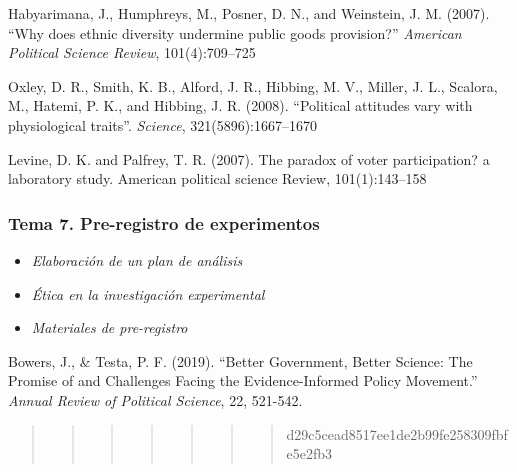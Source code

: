 \documentclass[
  12pt,
]{article}
\providecommand{\tightlist}{%
  \setlength{\itemsep}{0pt}\setlength{\parskip}{0pt}}
\begin{document}
Habyarimana, J., Humphreys, M., Posner, D. N., and Weinstein, J. M.
(2007). ``Why does ethnic diversity undermine public goods provision?''
\emph{American Political Science Review}, 101(4):709--725

Oxley, D. R., Smith, K. B., Alford, J. R., Hibbing, M. V., Miller, J.
L., Scalora, M., Hatemi, P. K., and Hibbing, J. R. (2008). ``Political
attitudes vary with physiological traits''. \emph{Science},
321(5896):1667--1670

Levine, D. K. and Palfrey, T. R. (2007). The paradox of voter
participation? a laboratory study. American political science Review,
101(1):143--158

\hypertarget{tema-7.-pre-registro-de-experimentos-1}{%
\subsubsection{Tema 7. Pre-registro de
experimentos}\label{tema-7.-pre-registro-de-experimentos-1}}

\begin{itemize}
\tightlist
\item
  \emph{Elaboración de un plan de análisis}
\item
  \emph{Ética en la investigación experimental}
\item
  \emph{Materiales de pre-registro}
\end{itemize}

Bowers, J., \& Testa, P. F. (2019). ``Better Government, Better Science:
The Promise of and Challenges Facing the Evidence-Informed Policy
Movement.'' \emph{Annual Review of Political Science}, 22, 521-542.

\begin{quote}
\begin{quote}
\begin{quote}
\begin{quote}
\begin{quote}
\begin{quote}
\begin{quote}
d29c5cead8517ee1de2b99fe258309fbfe5e2fb3
\end{quote}
\end{quote}
\end{quote}
\end{quote}
\end{quote}
\end{quote}
\end{quote}
\end{document}
